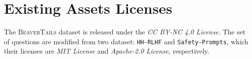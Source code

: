 \section{Existing Assets Licenses}
The \textsc{BeaverTails} dataset is released under the \textit{CC BY-NC 4.0 License}. 
The set of questions are modified from two dataset: \texttt{HH-RLHF} and \texttt{Safety-Prompts}, which their licenses are \textit{MIT License} and \textit{Apache-2.0 License}, respectively.